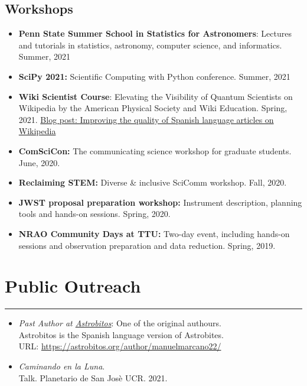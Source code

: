 \documentclass[letterpaper,10pt]{article}
\begin{document}
\subsection*{Workshops}
\begin{itemize}[label=$\blacktriangleright$]

\item \textbf{Penn State Summer School in Statistics for Astronomers}: Lectures and tutorials in statistics, astronomy, computer science, and informatics. Summer, 2021

\item \textbf{SciPy 2021:} Scientific Computing with Python conference. Summer, 2021
    \item  \textbf{Wiki Scientist Course}: Elevating the Visibility of Quantum Scientists on Wikipedia by the American Physical Society and Wiki Education. Spring, 2021. \href{https://wikiedu.org/blog/2021/05/24/improving-the-quality-of-spanish-language-articles-on-wikipedia/}{Blog post: Improving the quality of Spanish language articles on Wikipedia}
    \item \textbf{ComSciCon:} The communicating science workshop for graduate students. June, 2020.
    \item \textbf{Reclaiming STEM:} Diverse \& inclusive SciComm workshop. Fall, 2020.
    
            \item \textbf{JWST proposal preparation workshop:}  Instrument description, planning tools and hands-on sessions. Spring, 2020.

    
    
    
        \item \textbf{NRAO Community Days at TTU:}  Two-day event, including  hands-on sessions and observation preparation and data reduction. Spring, 2019.


\end{itemize}


\section*{Public Outreach}
\hrule
\vspace{.3 cm}
\begin{itemize}[label=$\blacktriangleright$]
\item \emph{Past Author at \href{https://astrobitos.org/}{Astrobitos}}: One of the original authours. \\ Astrobitos is the Spanish language version of Astrobites.\\ URL: \url{https://astrobitos.org/author/manuelmarcano22/}

\item \textit{Caminando en la Luna}. \\
Talk. Planetario de San Jos\`e UCR. 2021.
\end{itemize}
\end{document}
